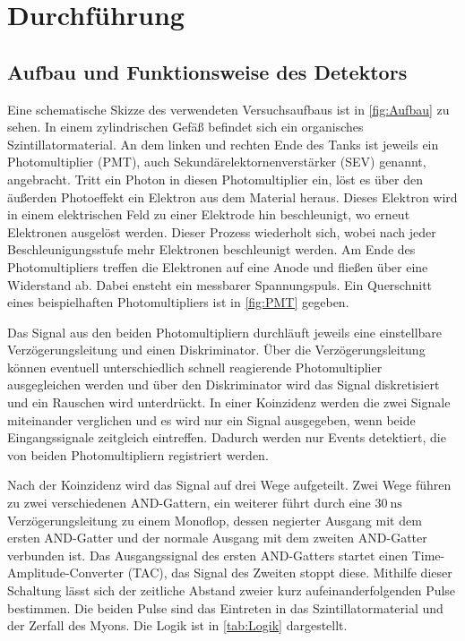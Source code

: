 \section{Durchführung}
\label{sec:Durchführung}
\subsection{Aufbau und Funktionsweise des Detektors}
\label{subsec:Aufbau}
Eine schematische Skizze des verwendeten Versuchsaufbaus ist in \autoref{fig:Aufbau} zu sehen. In einem zylindrischen Gefäß befindet sich ein organisches
Szintillatormaterial. An dem linken und rechten Ende des Tanks ist jeweils ein Photomultiplier (PMT), auch Sekundärelektornenverstärker (SEV) genannt, angebracht.
Tritt ein Photon in diesen Photomultiplier ein, löst es über den äußerden Photoeffekt ein Elektron aus dem Material heraus. Dieses Elektron wird in einem elektrischen Feld 
zu einer Elektrode hin beschleunigt, wo erneut Elektronen ausgelöst werden. Dieser Prozess wiederholt sich, wobei nach jeder Beschleunigungsstufe mehr Elektronen beschleunigt werden.
Am Ende des Photomultipliers treffen die Elektronen auf eine Anode und fließen über eine Widerstand ab. Dabei ensteht ein messbarer Spannungspuls. Ein Querschnitt eines beispielhaften
Photomultipliers ist in \autoref{fig:PMT} gegeben.

Das Signal aus den beiden Photomultipliern durchläuft jeweils eine einstellbare Verzögerungsleitung und einen Diskriminator. Über die Verzögerungsleitung können eventuell unterschiedlich
schnell reagierende Photomultiplier ausgegleichen werden und über den Diskriminator wird das Signal diskretisiert und ein Rauschen wird unterdrückt. In einer Koinzidenz werden die zwei 
Signale miteinander verglichen und es wird nur ein Signal ausgegeben, wenn beide Eingangssignale zeitgleich eintreffen. Dadurch werden nur Events detektiert, die von beiden
Photomultipliern registriert werden.

Nach der Koinzidenz wird das Signal auf drei Wege aufgeteilt. Zwei Wege führen zu zwei verschiedenen AND-Gattern, ein weiterer führt durch eine $\qty{30}{\nano\second}$ Verzögerungsleitung 
zu einem Monoflop, dessen negierter Ausgang mit dem ersten AND-Gatter und der normale Ausgang mit dem zweiten AND-Gatter verbunden ist. Das Ausgangssignal des ersten AND-Gatters startet 
einen Time-Amplitude-Converter (TAC), das Signal des Zweiten stoppt diese. Mithilfe dieser Schaltung lässt sich der zeitliche Abstand zweier kurz aufeinanderfolgenden Pulse bestimmen.
Die beiden Pulse sind das Eintreten in das Szintillatormaterial und der Zerfall des Myons. Die Logik ist in \autoref{tab:Logik} dargestellt.

